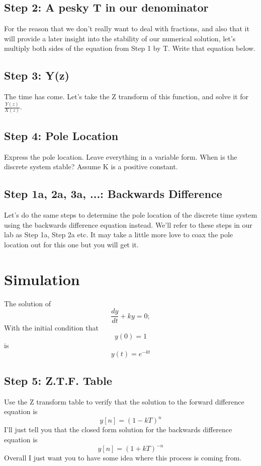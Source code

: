 \documentclass[10pt,a4paper]{article}
\begin{document}
\subsection*{Step 2: A pesky T in our denominator}
For the reason that we don't really want to deal with fractions, and also that it will provide a later insight into the stability of our numerical solution, let's multiply both sides of the equation from Step 1 by T.  Write that equation below. 
\subsection*{Step 3: Y(z)}
The time has come. Let's take the Z transform of this function, and solve it for $\frac{Y(z)}{X(z)}$.
\subsection*{Step 4: Pole Location}
Express the pole location.  Leave everything in a variable form.  When is the discrete system stable? Assume K is a positive constant.
\subsection*{Step 1a, 2a, 3a, ...: Backwards Difference}
Let's do the same steps to determine the pole location of the discrete time system using the backwards difference equation instead.  We'll refer to these steps in our lab as Step 1a, Step 2a etc. It may take a little more love to coax the pole location out for this one but you will get it.
\section*{Simulation}
The solution of
\begin{equation}
\frac{dy}{dt} + ky = 0; 
\end{equation}
With the initial condition that 
\begin{equation}
y(0) =1
\end{equation}
is
\begin{equation}
y(t) = e^{-kt}
\end{equation}
\subsection*{Step 5: Z.T.F. Table}
Use the Z transform table to verify that the solution to the forward difference equation is
\begin{equation}
y[n] = (1-kT)^{n}
\end{equation}
I'll just tell you that the closed form solution for the backwards difference equation is 
\begin{equation}
y[n] = (1+kT)^{-n}
\end{equation}
Overall I just want you to have some idea where this process is coming from.
\end{document}
